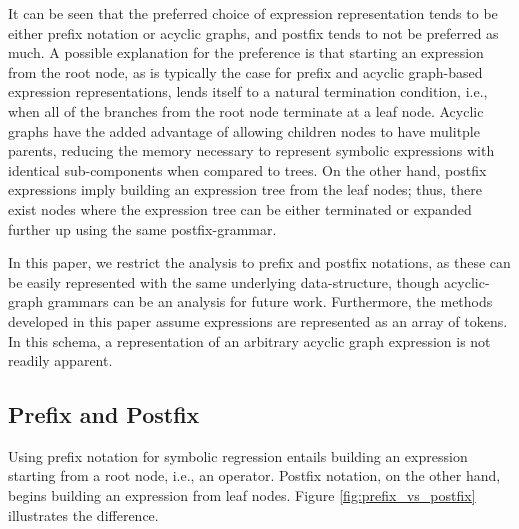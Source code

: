 \documentclass[12pt]{iopart}
\begin{document}
It can be seen that the preferred choice of expression representation tends to be either prefix notation or acyclic graphs, and postfix tends to not be preferred as much. A possible explanation for the preference is that starting an expression from the root node, as is typically the case for prefix and acyclic graph-based expression representations, lends itself to a natural termination condition, i.e., when all of the branches from the root node terminate at a leaf node. Acyclic graphs have the added advantage of allowing children nodes to have mulitple parents, reducing the memory necessary to represent symbolic expressions with identical sub-components when compared to trees. On the other hand, postfix expressions imply building an expression tree from the leaf nodes; thus, there exist nodes where the expression tree can be either terminated or expanded further up using the same postfix-grammar. 

In this paper, we restrict the analysis to prefix and postfix notations, as these can be easily represented with the same underlying data-structure, though acyclic-graph grammars can be an analysis for future work. Furthermore, the methods developed in this paper assume expressions are represented as an array of tokens. In this schema, a representation of an arbitrary acyclic graph expression is not readily apparent.


\subsection{Prefix and Postfix}
Using prefix notation for symbolic regression entails building an expression starting from a root node, i.e., an operator. Postfix notation, on the other hand, begins building an expression from leaf nodes. Figure \ref{fig:prefix_vs_postfix} illustrates the difference.
\end{document}
